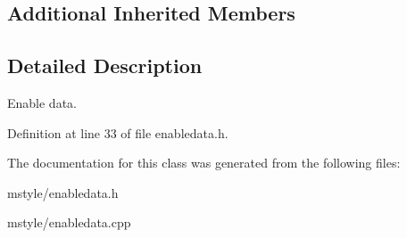 \subsection*{Additional Inherited Members}


\subsection{Detailed Description}
Enable data. 

Definition at line 33 of file enabledata.\+h.



The documentation for this class was generated from the following files\+:\begin{DoxyCompactItemize}
\item 
mstyle/enabledata.\+h\item 
mstyle/enabledata.\+cpp\end{DoxyCompactItemize}
